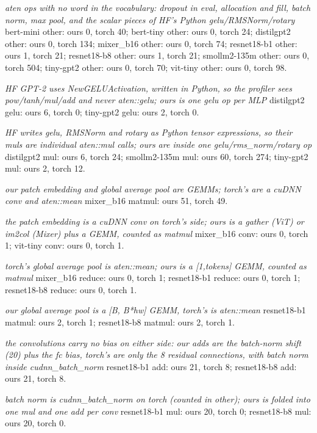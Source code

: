 \begin{minipage}{\linewidth}
\par\smallskip
\emph{aten ops with no word in the vocabulary: dropout in eval, allocation and fill, batch norm, max pool, and the scalar pieces of HF's Python gelu/RMSNorm/rotary} bert-mini other: ours 0, torch 40; bert-tiny other: ours 0, torch 24; distilgpt2 other: ours 0, torch 134; mixer\_b16 other: ours 0, torch 74; resnet18-b1 other: ours 1, torch 21; resnet18-b8 other: ours 1, torch 21; smollm2-135m other: ours 0, torch 504; tiny-gpt2 other: ours 0, torch 70; vit-tiny other: ours 0, torch 98.
\par\smallskip
\emph{HF GPT-2 uses NewGELUActivation, written in Python, so the profiler sees pow/tanh/mul/add and never aten::gelu; ours is one gelu op per MLP} distilgpt2 gelu: ours 6, torch 0; tiny-gpt2 gelu: ours 2, torch 0.
\par\smallskip
\emph{HF writes gelu, RMSNorm and rotary as Python tensor expressions, so their muls are individual aten::mul calls; ours are inside one gelu/rms\_norm/rotary op} distilgpt2 mul: ours 6, torch 24; smollm2-135m mul: ours 60, torch 274; tiny-gpt2 mul: ours 2, torch 12.
\par\smallskip
\emph{our patch embedding and global average pool are GEMMs; torch's are a cuDNN conv and aten::mean} mixer\_b16 matmul: ours 51, torch 49.
\par\smallskip
\emph{the patch embedding is a cuDNN conv on torch's side; ours is a gather (ViT) or im2col (Mixer) plus a GEMM, counted as matmul} mixer\_b16 conv: ours 0, torch 1; vit-tiny conv: ours 0, torch 1.
\par\smallskip
\emph{torch's global average pool is aten::mean; ours is a [1,tokens] GEMM, counted as matmul} mixer\_b16 reduce: ours 0, torch 1; resnet18-b1 reduce: ours 0, torch 1; resnet18-b8 reduce: ours 0, torch 1.
\par\smallskip
\emph{our global average pool is a [B, B*hw] GEMM, torch's is aten::mean} resnet18-b1 matmul: ours 2, torch 1; resnet18-b8 matmul: ours 2, torch 1.
\par\smallskip
\emph{the convolutions carry no bias on either side: our adds are the batch-norm shift (20) plus the fc bias, torch's are only the 8 residual connections, with batch norm inside cudnn\_batch\_norm} resnet18-b1 add: ours 21, torch 8; resnet18-b8 add: ours 21, torch 8.
\par\smallskip
\emph{batch norm is cudnn\_batch\_norm on torch (counted in other); ours is folded into one mul and one add per conv} resnet18-b1 mul: ours 20, torch 0; resnet18-b8 mul: ours 20, torch 0.

\end{minipage}
